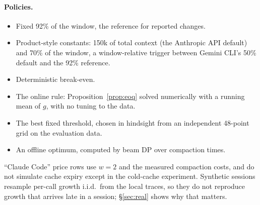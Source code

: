 \documentclass[11pt]{article}
\begin{document}
\paragraph{Policies.}
\begin{itemize}
\item Fixed 92\% of the window, the reference for reported changes.
\item Product-style constants: 150k of total context (the Anthropic API default) and 70\% of the window, a window-relative trigger between Gemini CLI's 50\% default and the 92\% reference.
\item Deterministic break-even.
\item The online rule: Proposition~\ref{prop:eoq} solved numerically with a running mean of $g$, with no tuning to the data.
\item The best fixed threshold, chosen in hindsight from an independent 48-point grid on the evaluation data.
\item An offline optimum, computed by beam DP over compaction times.
\end{itemize}
``Claude Code'' price rows use $w=2$ and the measured compaction costs, and do not simulate cache expiry except in the cold-cache experiment. Synthetic sessions resample per-call growth i.i.d.\ from the local traces, so they do not reproduce growth that arrives late in a session; \S\ref{sec:real} shows why that matters.

\begin{table}[t]
\centering
\small
\caption{Cost change (\%) vs.\ a fixed 92\%-of-window trigger; negative is cheaper. $H^\star$ is the online rule's target at the dataset's mean growth. ``Best fixed'' is tuned in hindsight on the evaluation data. Synthetic rows use 300 sessions resampled from the local traces, or 1{,}500 SWE-agent trajectories.}
\label{tab:main}
\resizebox{\linewidth}{!}{}
\end{table}
\end{document}
